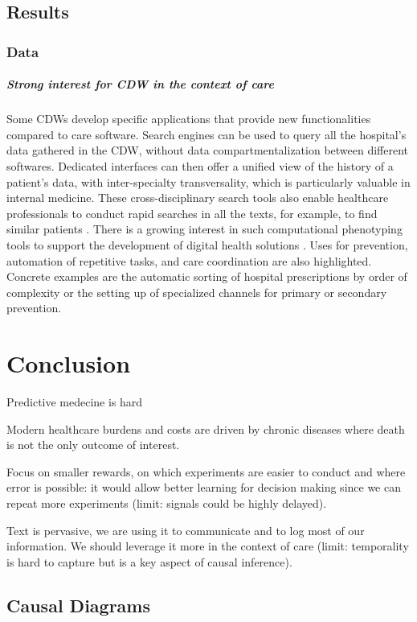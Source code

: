 \documentclass{report}
\begin{document}
\section{Results}\label{sec:good_practices:results}
\subsection{Data}\label{subsec:good_practices:results:data}

\paragraph{Strong interest for CDW in the context of care}

Some CDWs develop specific applications that provide new functionalities
compared to care software. Search engines can be used to query all the
hospital's data gathered in the CDW, without data compartmentalization between
different softwares. Dedicated interfaces can then offer a unified view of the
history of a patient's data, with inter-specialty transversality, which is
particularly valuable in internal medicine. These cross-disciplinary search
tools also enable healthcare professionals to conduct rapid searches in all the
texts, for example, to find similar patients \citep{garcelon2017finding}.
%
There is a growing interest in such computational phenotyping tools to support
the development of digital health solutions \citep{wen2023impact}.
%
Uses for prevention, automation of repetitive tasks, and care coordination are
also highlighted. Concrete examples are the automatic sorting of hospital
prescriptions by order of complexity or the setting up of specialized channels
for primary or secondary prevention.


\chapter{Conclusion}


Predictive medecine is hard

Modern healthcare burdens and costs are driven by chronic diseases where death
is not the only outcome of interest.

Focus on smaller rewards, on which experiments are easier to conduct and where
error is possible: it would allow better learning for decision making since we
can repeat more experiments (limit: signals could be highly delayed).

Text is pervasive, we are using it to communicate and to log most of our
information. We should leverage it more in the context of care (limit:
temporality is hard to capture but is a key aspect of causal inference).

\printbibliography

\appendix

\clearpage

\section{Causal Diagrams}
\end{document}
